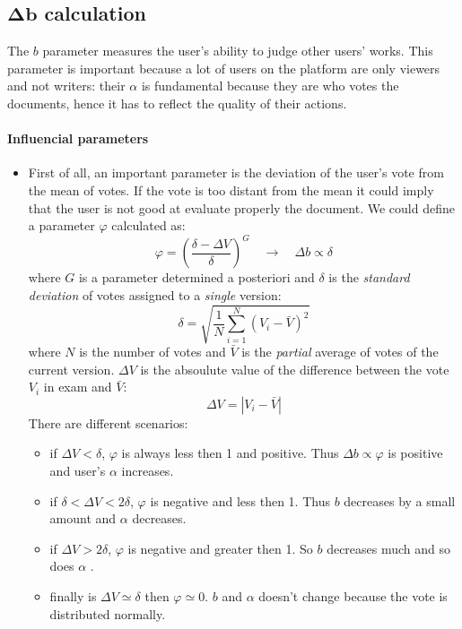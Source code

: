 \documentclass[a4paper,11pt]{article}
\newcommand{\al}{$\alpha$ }
\begin{document}
\subsection{$\mathbf{\Delta b}$ calculation} \label{sec:deltab}
The $b$ parameter measures the user's ability  to judge other users' works. This parameter is important because a lot of users on the platform are only viewers and not writers: their \al is fundamental because they are who votes the documents, hence it has to reflect the quality of their actions.

\paragraph{Influencial parameters}
\begin{itemize}
\item First of all, an important parameter is the deviation of the user's vote from the mean of votes. If the vote is too distant from the mean it could imply that the user is not good at evaluate properly the document. We could define a parameter $\varphi$ calculated as:
\begin{equation}
\varphi = \left(\frac{\delta - \Delta V}{\delta}\right)^G \quad \longrightarrow \quad \Delta b \propto \delta
\end{equation}
where $G$ is a parameter determined a posteriori and $\delta$ is the \emph{standard deviation} of votes assigned to a \emph{single} version:
\begin{equation}
\delta = \sqrt{ \frac{1}{N} \sum_{i=1}^N \left(V_i - \bar{V}\right)^2} 
\end{equation}
where $N$ is the number of votes and $\bar{V}$ is the \emph{partial} average of votes of the current version. $\Delta V$ is the absoulute value of the difference between the vote $V_i$ in exam and $\bar{V}$:
\begin{equation}
\Delta V = | V_i - \bar{V}|
\end{equation}
There are different scenarios:
\begin{itemize}
\item if $\Delta V < \delta$, $\varphi$ is always less then 1 and positive. Thus $\Delta b\propto \varphi$ is positive and user's \al increases.
\item if $\delta < \Delta V < 2\delta$, $\varphi$ is negative and less then 1. Thus $b$ decreases by a small amount and \al decreases.
\item if $\Delta V > 2\delta$, $\varphi$ is negative and greater then 1. So $b$ decreases much and so does \al.
\item finally is $\Delta V \simeq \delta$ then $\varphi \simeq 0$. $b$ and \al doesn't change because the vote is distributed normally.
\end{itemize}


\end{itemize}
\end{document}
